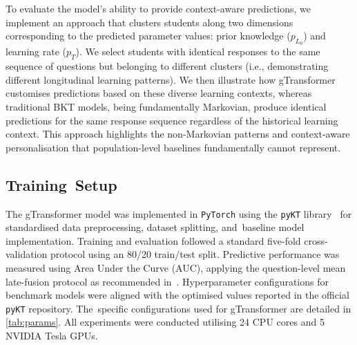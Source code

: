 \documentclass[applsci,article,accept,moreauthors,pdftex]{Definitions/mdpi}
\begin{document}
{To evaluate the model's ability to provide context-aware predictions, we implement an approach that clusters students along two dimensions corresponding to the predicted parameter values: prior knowledge ($p_{L_0}$) and learning rate ($p_T$). We select students with identical responses to the same sequence of questions but belonging to different clusters (i.e., demonstrating different longitudinal learning patterns). We then illustrate how gTransformer customises predictions based on these diverse learning contexts, whereas traditional BKT models, being fundamentally Markovian, produce identical predictions for the same response sequence regardless of the historical learning context. This approach highlights the non-Markovian patterns and context-aware personalisation that population-level baselines fundamentally cannot represent.}

\subsection{Training~Setup}

The gTransformer model was implemented in \texttt{PyTorch} using the \texttt{pyKT} library~\citep{liu2022pykt} for {standardised} data preprocessing, dataset splitting, and~baseline model implementation. Training and evaluation followed a standard five-fold cross-validation protocol using an 80/20 train/test split. Predictive performance was measured using Area Under the Curve (AUC), applying the question-level mean late-fusion protocol as recommended in~\cite{liu2022pykt}. Hyperparameter configurations for benchmark models were aligned with the {optimised} values reported in the official \texttt{pyKT} repository. The~specific configurations used for gTransformer are detailed in \cref{tab:params}. {All experiments were conducted utilising 24 CPU cores and 5 NVIDIA Tesla GPUs.}
\end{document}
